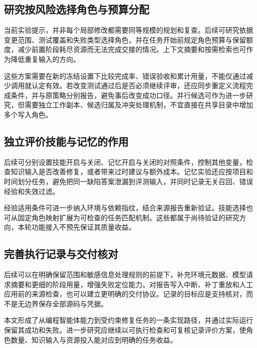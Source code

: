 \subsection{研究按风险选择角色与预算分配}\label{sec:7.4.2}

当前实验提示，并非每个局部修改都需要同等规模的规划和复查。后续可研究依据变更范围、测试覆盖和失败类型选择角色，并在任务开始前规定角色预算与保留额度，减少前置阶段耗尽资源而无法完成交接的情况。上下文摘要和按需检索也可作为降低重复输入的方向。

这些方案需要在新的冻结设置下比较完成率、错误验收和累计用量，不能仅通过减少调用就认定有效。若改变测试通过后是否必须继续评审，还应同步重定义流程完成条件，并与原策略分别报告，避免事后改变成功口径。并行候选可作为进一步研究，但需要独立工作副本、候选归属及冲突处理机制，不宜直接在共享目录中增加多个写入角色。

\subsection{独立评价技能与记忆的作用}\label{sec:7.4.3}

后续可分别设置技能开启与关闭、记忆开启与关闭的对照条件，控制其他变量，检查知识输入是否改善修复，或者带来过时建议与额外成本。记忆实验还应按项目和时间划分任务，避免把同一缺陷答案泄漏到评测输入，并同时记录无关召回、错误经验和失效过滤。

经验适用条件可进一步纳入环境与依赖指纹，结合来源报告重新验证。技能选择也可从固定角色映射扩展为可检查的任务匹配机制。这些都属于尚待验证的研究方向，本轮功能接入不预先保证其质量收益。

\subsection{完善执行记录与交付核对}\label{sec:7.4.4}

后续可以在明确保留范围和敏感信息处理规则的前提下，补充环境元数据、模型请求摘要和更细的阶段用量，增强失败定位能力。对报告写入中断、补丁重放和人工应用前的来源检查，也可以建立更明确的交付协议。记录的目标应是支持核对，而不是无边界保存全部源码与凭据。

本文形成了从编程智能体能力到受约束修复任务的一条实现路径，并通过实际运行保留其成功和失败。进一步研究应继续以可执行检查和可复核记录评价方案，使角色数量、知识输入与资源投入能对应到明确的任务收益。
